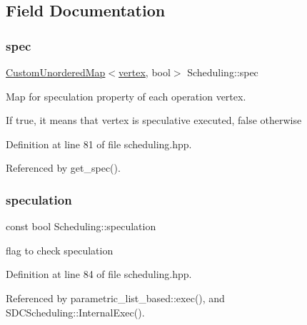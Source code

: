 \subsection{Field Documentation}
\mbox{\label{classScheduling_a339591a82e4f4ca0340dd19ace0f632d}} 
\subsubsection{\texorpdfstring{spec}{spec}}
{\footnotesize\ttfamily \hyperlink{custom__map_8hpp_ad1ed68f2ff093683ab1a33522b144adc}{Custom\+Unordered\+Map}$<$\hyperlink{graph_8hpp_abefdcf0544e601805af44eca032cca14}{vertex}, bool$>$ Scheduling\+::spec\hspace{0.3cm}{\ttfamily [protected]}}



Map for speculation property of each operation vertex. 

If true, it means that vertex is speculative executed, false otherwise 

Definition at line 81 of file scheduling.\+hpp.



Referenced by get\+\_\+spec().

\mbox{\label{classScheduling_a930765bc71ebc46f138194dcdf3bd4cb}} 
\subsubsection{\texorpdfstring{speculation}{speculation}}
{\footnotesize\ttfamily const bool Scheduling\+::speculation\hspace{0.3cm}{\ttfamily [protected]}}



flag to check speculation 



Definition at line 84 of file scheduling.\+hpp.



Referenced by parametric\+\_\+list\+\_\+based\+::exec(), and S\+D\+C\+Scheduling\+::\+Internal\+Exec().

\mbox{\label{classScheduling_a90ca1317af84b97b8a0b7b6216b130b6}} 
